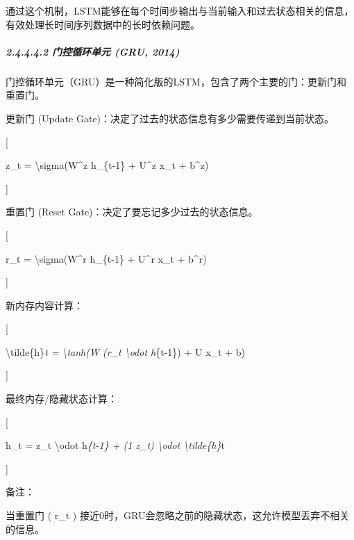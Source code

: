 通过这个机制，LSTM能够在每个时间步输出与当前输入和过去状态相关的信息，有效处理长时间序列数据中的长时依赖问题。

\subparagraph{\texorpdfstring{\textbf{2.4.4.4.2} \textbf{门控循环单元
(GRU,
2014)}}{2.4.4.4.2 门控循环单元 (GRU, 2014)}}\label{24442-ux95e8ux63a7ux5faaux73afux5355ux5143-gru-2014}

门控循环单元（GRU）是一种简化版的LSTM，包含了两个主要的门：更新门和重置门。

更新门 (Update Gate)：决定了过去的状态信息有多少需要传递到当前状态。

{[}

z\_t = \textbackslash sigma(W\^{}z h\_\{t-1\} + U\^{}z x\_t + b\^{}z)

{]}


重置门 (Reset Gate)：决定了要忘记多少过去的状态信息。

{[}

r\_t = \textbackslash sigma(W\^{}r h\_\{t-1\} + U\^{}r x\_t + b\^{}r)

{]}


新内存内容计算：

{[}

\textbackslash tilde\{h\}\emph{t = \textbackslash tanh(W (r\_t
\textbackslash odot h}\{t-1\}) + U x\_t + b)

{]}


最终内存/隐藏状态计算：

{[}

h\_t = z\_t \textbackslash odot h\emph{\{t-1\} + (1 z\_t)
\textbackslash odot \textbackslash tilde\{h\}}t

{]}


备注：

当重置门 ( r\_t )
接近0时，GRU会忽略之前的隐藏状态，这允许模型丢弃不相关的信息。

